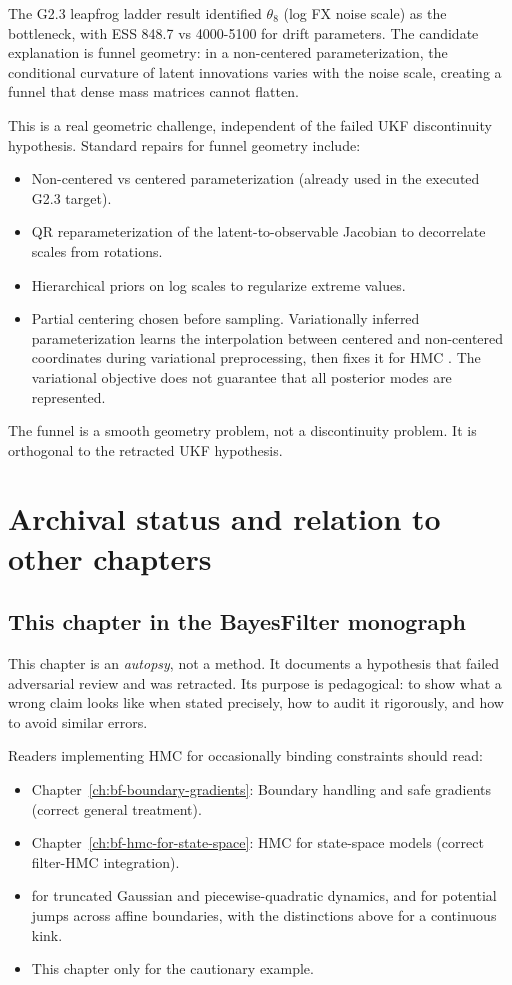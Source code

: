 The G2.3 leapfrog ladder result identified $\theta_8$ (log FX noise scale) as the bottleneck, with ESS 848.7 vs 4000-5100 for drift parameters. The candidate explanation is funnel geometry: in a non-centered parameterization, the conditional curvature of latent innovations varies with the noise scale, creating a funnel that dense mass matrices cannot flatten.

This is a real geometric challenge, independent of the failed UKF discontinuity hypothesis. Standard repairs for funnel geometry include:
\begin{itemize}
\item Non-centered vs centered parameterization (already used in the executed G2.3 target).
\item QR reparameterization of the latent-to-observable Jacobian to decorrelate scales from rotations.
\item Hierarchical priors on log scales to regularize extreme values.
\item Partial centering chosen before sampling. Variationally inferred
parameterization learns the interpolation between centered and non-centered
coordinates during variational preprocessing, then fixes it for HMC
\citep[Section~5.2 and Appendix~C]{Gorinova2020}. The variational objective
does not guarantee that all posterior modes are represented.
\end{itemize}

The funnel is a smooth geometry problem, not a discontinuity problem. It is orthogonal to the retracted UKF hypothesis.

\section{Archival status and relation to other chapters}

\subsection{This chapter in the BayesFilter monograph}

This chapter is an \emph{autopsy}, not a method. It documents a hypothesis that failed adversarial review and was retracted. Its purpose is pedagogical: to show what a wrong claim looks like when stated precisely, how to audit it rigorously, and how to avoid similar errors.

Readers implementing HMC for occasionally binding constraints should read:
\begin{itemize}
\item Chapter~\ref{ch:bf-boundary-gradients}: Boundary handling and safe gradients (correct general treatment).
\item Chapter~\ref{ch:bf-hmc-for-state-space}: HMC for state-space models (correct filter-HMC integration).
\item \citet{Pakman2014} for truncated Gaussian and piecewise-quadratic
dynamics, and \citet{Afshar2015} for potential jumps across affine boundaries,
with the distinctions above for a continuous kink.
\item This chapter only for the cautionary example.
\end{itemize}

